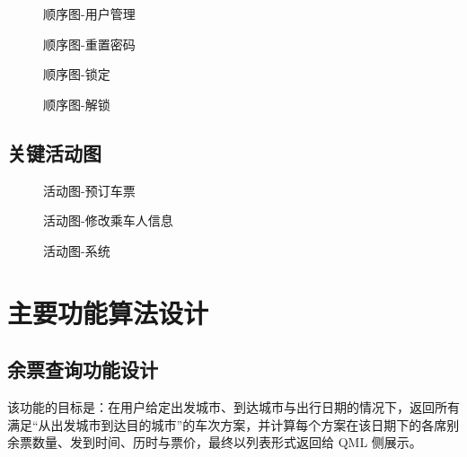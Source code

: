 \documentclass{article}
\begin{document}
			\begin{figure}[H]
				\centering
				
				\caption{顺序图-用户管理}
				\label{顺序图-用户管理}
			\end{figure}
			\begin{figure}[H]
				\centering
				
				\caption{顺序图-重置密码}
				\label{顺序图-重置密码}
			\end{figure}
			\begin{figure}[H]
				\centering
				
				\caption{顺序图-锁定}
				\label{顺序图-锁定}
			\end{figure}
			\begin{figure}[H]
				\centering
				
				\caption{顺序图-解锁}
				\label{顺序图-解锁}
			\end{figure}
			
	
		\subsection{关键活动图}
			\begin{figure}[H]
				\centering
				
				\caption{活动图-预订车票}
				\label{活动图-预订车票}
			\end{figure}
			\begin{figure}[H]
				\centering
				
				\caption{活动图-修改乘车人信息}
				\label{活动图-修改乘车人信息}
			\end{figure}
			\begin{figure}[H]
				\centering
				
				\caption{活动图-系统}
				\label{活动图-系统}
			\end{figure}
		
	\section{主要功能算法设计}
		\subsection{余票查询功能设计}
			该功能的目标是：在用户给定出发城市、到达城市与出行日期的情况下，返回所有满足“从出发城市到达目的城市”的车次方案，并计算每个方案在该日期下的各席别余票数量、发到时间、历时与票价，最终以列表形式返回给 QML 侧展示。
			
\end{document}
